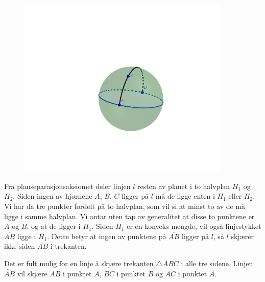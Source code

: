 \begin{oppgave}[3.3.4]
\begin{punkt}
    \begin{figure}[H]
      \centering 
      \includegraphics[trim={13cm 13cm 12cm 23cm},clip, width=0.9\textwidth]{oving_2/334c.png}
    \end{figure}
  \end{punkt}
\end{oppgave}

\begin{oppgave}[3.3.5]
  Fra planseparasjonsaksiomet deler linjen $l$ resten av planet i to halvplan $H_1$ og $H_2$. 
  Siden ingen av hjørnene $A$, $B$, $C$ ligger på $l$ må de ligge enten i $H_1$ eller 
  $H_2$. Vi har da tre punkter fordelt på to halvplan, som vil si at minst to av de må ligge i samme
  halvplan. Vi antar uten tap av generalitet at disse to punktene er $A$ og $B$, og at de ligger i 
  $H_1$. Siden $H_1$ er en konveks mengde, vil også linjestykket $\overline{AB}$ ligge i $H_1$. Dette
  betyr at ingen av punktene på $\overline{AB}$ ligger på $l$, så $l$ skjærer ikke siden $\overline{AB}$
  i trekanten. 

  Det er fult mulig for en linje å skjære trekanten $\triangle ABC$ i alle tre sidene. Linjen 
  $\overleftrightarrow{AB}$ vil skjære $\overline{AB}$ i punktet $A$, $\overline{BC}$ i punktet $B$ og 
  $\overline{AC}$ i punktet $A$. 

\end{oppgave}
 

